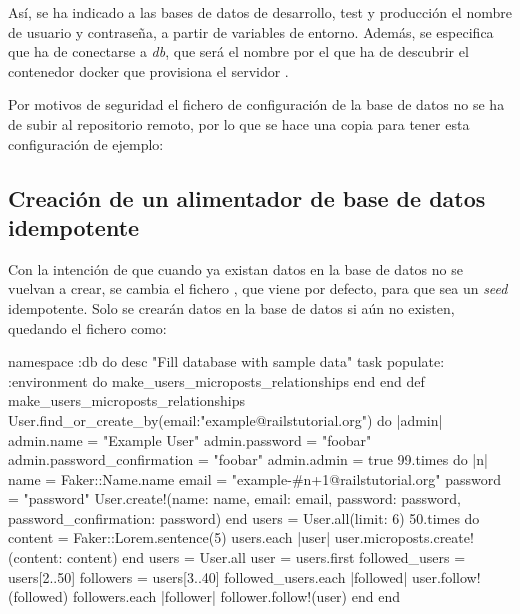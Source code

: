 Así, se ha indicado a las bases de datos de desarrollo, test y producción el nombre de usuario y contraseña, a partir de variables de entorno. Además, se especifica que ha de conectarse a \textit{db}, que será el nombre por el que ha de descubrir el contenedor docker que provisiona el servidor .

Por motivos de seguridad el fichero de configuración de la base de datos no se ha de subir al repositorio remoto, por lo que se hace una copia para tener esta configuración de ejemplo:


\subsection{Creación de un alimentador de base de datos idempotente}

Con la intención de que cuando ya existan datos en la base de datos no se vuelvan a crear, se cambia el fichero , que viene por defecto, para que sea un \textit{seed} idempotente. Solo se crearán datos en la base de datos si aún no existen, quedando el fichero como:

\begin{codelisting}
\label{code:idempotentseed}
\begin{code}
namespace :db do
  desc "Fill database with sample data"
  task populate: :environment do
    make_users_microposts_relationships
  end
end
def make_users_microposts_relationships
  User.find_or_create_by(email:"example@railstutorial.org") do |admin| 
  	admin.name = "Example User"
	admin.password = "foobar"
        admin.password_confirmation = "foobar"
        admin.admin = true
	99.times do |n|
	    name  = Faker::Name.name
	    email = "example-#{n+1}@railstutorial.org"
	    password  = "password"
	    User.create!(name:     name,
                 email:    email,
                 password: password,
                 password_confirmation: password)
        end
	users = User.all(limit: 6)
  	50.times do
	    content = Faker::Lorem.sentence(5)
	    users.each { |user| user.microposts.create!(content: content) }
	end  
	users = User.all
	user  = users.first
	followed_users = users[2..50]
	followers      = users[3..40]
	followed_users.each { |followed| user.follow!(followed) }
	followers.each      { |follower| follower.follow!(user) }
  end
end
\end{code}
\end{codelisting}


